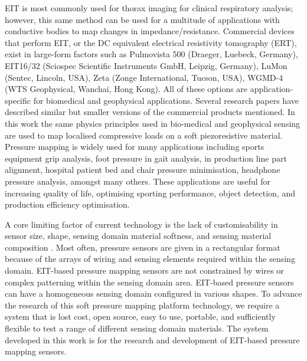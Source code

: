 EIT is most commonly used for thorax imaging for clinical respiratory analysis; however, this same method can be used for a multitude of applications with conductive bodies to map changes in impedance/resistance. 
Commercial devices that perform EIT, or the DC equivalent electrical resistivity tomography (ERT), exist in large-form factors such as Pulmovista 500 (Draeger, Luebeck, Germany), EIT16/32 (Sciospec Scientific Instruments GmbH, Leipzig, Germany), LuMon (Sentec, Lincoln, USA), Zeta (Zonge International, Tucson, USA), WGMD-4 (WTS Geophysical, Wanchai, Hong Kong). All of these options are application-specific for biomedical and geophysical applications. Several research papers \cite{Chen2023,Hong2015,Lee2020,Li2023,Soleimani2006,Suh2022,Tiwari2022,Xu2022,Zhang2015,Zhang2016} have described similar but smaller versions of the commercial products mentioned.
In this work the same physics principles used in bio-medical and geophysical sensing are used to map localised compressive loads on a soft piezoresistive material. Pressure mapping is widely used for many applications including sports equipment grip analysis, foot pressure in gait analysis, in production line part alignment, hospital patient bed and chair pressure minimisation, headphone pressure analysis, amongst many others. These applications are useful for increasing quality of life, optimising sporting performance, object detection, and production efficiency optimisation.

A core limiting factor of current technology is the lack of customisability in sensor size, shape, sensing domain material softness, and sensing material composition \cite{Gilanizadehdizaj2022,Rossiter2005,Liang2015,Fu2020}. Most often, pressure sensors are given in a rectangular format because of the arrays of wiring and sensing elements required within the sensing domain. EIT-based pressure mapping sensors are not constrained by wires or complex patterning within the sensing domain area. EIT-based pressure sensors can have a homogeneous sensing domain configured in various shapes.
To advance the research of this soft pressure mapping platform technology, we require a system that is lost cost, open source, easy to use, portable, and sufficiently flexible to test a range of different sensing domain materials. The system developed in this work is for the research and development of EIT-based pressure mapping sensors. 

